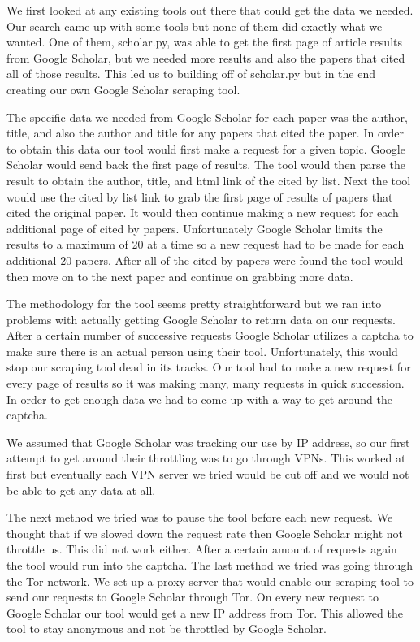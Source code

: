 \documentclass[letterpaper]{article}
\begin{document}
We first looked at any existing tools out there that could get the data we needed.
Our search came up with some tools but none of them did exactly what we wanted.
One of them, scholar.py, was able to get the first page of article results from Google Scholar, but we needed more results and also the papers that cited all of those results.
This led us to building off of scholar.py but in the end creating our own Google Scholar scraping tool.

The specific data we needed from Google Scholar for each paper was the author, title, and also the author and title for any papers that cited the paper.
In order to obtain this data our tool would first make a request for a given topic.
Google Scholar would send back the first page of results.
The tool would then parse the result to obtain the author, title, and html link of the cited by list.
Next the tool would use the cited by list link to grab the first page of results of papers that cited the original paper.
It would then continue making a new request for each additional page of cited by papers. Unfortunately Google Scholar limits the results to a maximum of 20 at a time so a new request had to be made for each additional 20 papers.
After all of the cited by papers were found the tool would then move on to the next paper and continue on grabbing more data.

The methodology for the tool seems pretty straightforward but we ran into problems with actually getting Google Scholar to return data on our requests.
After a certain number of successive requests Google Scholar utilizes a captcha to make sure there is an actual person using their tool.
Unfortunately, this would stop our scraping tool dead in its tracks.
Our tool had to make a new request for every page of results so it was making many, many requests in quick succession.
In order to get enough data we had to come up with a way to get around the captcha.

We assumed that Google Scholar was tracking our use by IP address, so our first attempt to get around their throttling was to go through VPNs.
This worked at first but eventually each VPN server we tried would be cut off and we would not be able to get any data at all.

The next method we tried was to pause the tool before each new request.
We thought that if we slowed down the request rate then Google Scholar might not throttle us.
This did not work either. After a certain amount of requests again the tool would run into the captcha.
The last method we tried was going through the Tor network.
We set up a proxy server that would enable our scraping tool to send our requests to Google Scholar through Tor.
On every new request to Google Scholar our tool would get a new IP address from Tor.
This allowed the tool to stay anonymous and not be throttled by Google Scholar.
\end{document}
